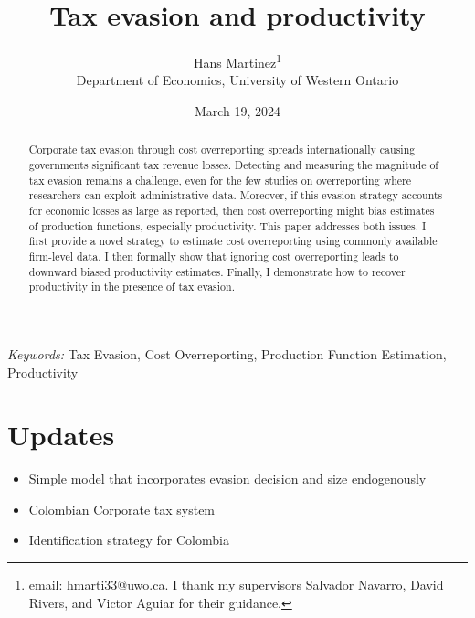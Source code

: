\documentclass[
  12pt]{article}
\providecommand{\tightlist}{%
  \setlength{\itemsep}{0pt}\setlength{\parskip}{0pt}}\usepackage{longtable,booktabs,array}
\theoremstyle{definition}
\theoremstyle{remark}
\begin{document}
\def\spacingset#1{\renewcommand{\baselinestretch}%
{#1}\small\normalsize} \spacingset{1}



\date{March 19, 2024}
\title{\bf Tax evasion and productivity}
\author{
Hans Martinez\thanks{email: hmarti33@uwo.ca. I thank my supervisors
Salvador Navarro, David Rivers, and Victor Aguiar for their guidance.}\\
Department of Economics, University of Western Ontario\\
}
\maketitle

\bigskip
\bigskip
\begin{abstract}
Corporate tax evasion through cost overreporting spreads internationally
causing governments significant tax revenue losses. Detecting and
measuring the magnitude of tax evasion remains a challenge, even for the
few studies on overreporting where researchers can exploit
administrative data. Moreover, if this evasion strategy accounts for
economic losses as large as reported, then cost overreporting might bias
estimates of production functions, especially productivity. This paper
addresses both issues. I first provide a novel strategy to estimate cost
overreporting using commonly available firm-level data. I then formally
show that ignoring cost overreporting leads to downward biased
productivity estimates. Finally, I demonstrate how to recover
productivity in the presence of tax evasion.
\end{abstract}

\noindent%
{\it Keywords:} Tax Evasion, Cost Overreporting, Production Function
Estimation, Productivity
\vfill

\newpage
\spacingset{1.9} %

\section*{Updates}\label{updates}

\begin{itemize}
\tightlist
\item
  Simple model that incorporates evasion decision and size endogenously
\item
  Colombian Corporate tax system
\item
  Identification strategy for Colombia
\end{itemize}
\end{document}
